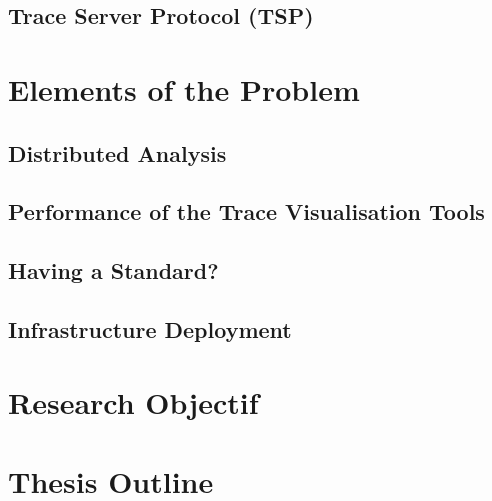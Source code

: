 \subsection{Trace Server Protocol (TSP)}

\clearpage

\section{Elements of the Problem}  %

\subsection{Distributed Analysis}

\subsection{Performance of the Trace Visualisation Tools}

\subsection{Having a Standard?}

\subsection{Infrastructure Deployment}




\section{Research Objectif}  %


\section{Thesis Outline}  %
